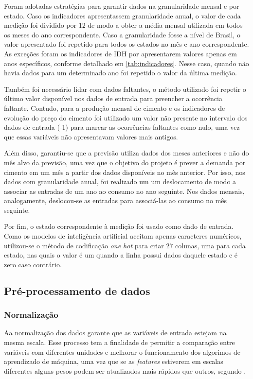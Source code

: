 Foram adotadas estratégias para garantir dados na granularidade
mensal e por estado. Caso os indicadores apresentassem granularidade anual, o valor de
cada medição foi dividido por 12 de modo a obter a média mensal utilizada em 
todos os meses do ano correspondente. Caso a granularidade
fosse a nível de Brasil, o valor apresentado foi repetido para todos os 
estados no mês e ano correspondente. As exceções foram os 
indicadores de IDH por apresentarem valores apenas em anos específicos, conforme 
detalhado em \ref{tab:indicadores}. Nesse caso, quando não havia dados para um 
determinado ano foi repetido o valor da última medição.

Também foi necessário lidar com dados faltantes, o método utilizado foi
repetir o último valor disponível nos dados de entrada para
preencher a ocorrência faltante. Contudo, para a produção mensal de cimento e os 
indicadores de evolução do preço do cimento foi utilizado um valor não 
presente no intervalo dos dados de entrada (-1) para marcar as ocorrências 
faltantes como nulo, uma vez que essas variáveis não apresentavam 
valores mais antigos.

Além disso, garantiu-se que a previsão
 utiliza dados dos meses anteriores e não do mês alvo da
previsão, uma vez que o objetivo do projeto é prever a demanda
por cimento em um mês a partir dos dados disponíveis no mês anterior.
Por isso, nos dados com granularidade anual, foi realizado um um 
deslocamento de modo a associar as entradas de um ano ao consumo no 
ano seguinte. Nos dados mensais, analogamente, deslocou-se as entradas 
para associá-las ao consumo no mês seguinte.

Por fim, o estado correspondente à medição foi usado como dado de entrada. 
Como os modelos de inteligência artificial aceitam apenas caracteres numéricos,
utilizou-se o método de codificação \textit{one hot} para criar 27 colunas, uma
para cada estado, nas quais o valor é um quando a linha possui dados daquele estado 
e é zero caso contrário.


\subsection{Pré-processamento de dados}
\label{sec:norm_dados}


\subsubsection{Normalização}

Aa normalização dos dados garante que as variáveis de entrada 
estejam na mesma escala. Esse processo tem a finalidade de permitir a comparação 
entre variáveis com diferentes unidades e melhorar o funcionamento dos 
algorimos de aprendizado de máquina, uma vez que se as \textit{features} estiverem em escalas diferentes
alguns pesos podem ser atualizados mais rápidos que outros, segundo \citet{Raschka}.


